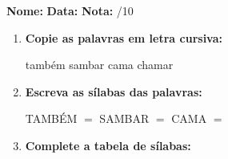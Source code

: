 \begin{exercicio}



\noindent\textbf{Nome:} \underline{\hspace{3.2cm}} \quad \textbf{Data:} \underline{\hspace{1.6cm}} \quad \textbf{Nota:} \underline{\hspace{0.9cm}}/10


\begin{enumerate}

  \item \textbf{Copie as palavras em letra cursiva:}
  \begin{center}
  também \quad sambar \quad cama \quad chamar
  \end{center}
  \begin{center}
  \underline{\hspace{2.4cm}} \quad \underline{\hspace{2.4cm}} \quad \underline{\hspace{2.4cm}} \quad \underline{\hspace{2.4cm}}
  \end{center}

  \item \textbf{Escreva as sílabas das palavras:}
  \begin{center}
  TAMBÉM $=$ \underline{\hspace{1.5cm}} \underline{\hspace{1.5cm}} \quad SAMBAR $=$ \underline{\hspace{1.5cm}} \underline{\hspace{1.5cm}} \quad CAMA $=$ \underline{\hspace{1.5cm}} \underline{\hspace{1.5cm}}
  \end{center}

  \item \textbf{Complete a tabela de sílabas:}

\begin{center}
\end{center}


\end{enumerate}
\end{exercicio}

